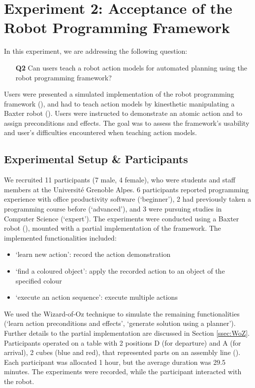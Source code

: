 \section{Experiment 2: Acceptance of the Robot Programming Framework}
\label{sec:Exp2}

In this experiment, we are addressing the following question:

\begin{enumerate}
  \item[\textbf{Q2}] Can users teach a robot action models for automated planning using the robot programming framework?
\end{enumerate}

Users were presented a simulated implementation of the robot programming framework (), and had to teach action models by kinesthetic manipulating a Baxter robot (). 
Users were instructed to demonstrate an atomic action and to assign preconditions and effects.
The goal was to assess the framework's usability and user's difficulties encountered when teaching action models.

\subsection{Experimental Setup \& Participants}
We recruited 11 participants (7 male, 4 female), who were students and staff members at the Universit\'{e} Grenoble Alpes. 
6 participants reported programming experience with office productivity software (`beginner'), 2 had previously taken a programming course before (`advanced'), and 3 were pursuing studies in Computer Science (`expert').
The experiments were conducted using a Baxter robot (), mounted with a partial implementation of the framework.
The implemented functionalities included:
\begin{itemize}
	\item `learn new action': record the action demonstration
	\item `find a coloured object': apply the recorded action to an object of the specified colour
	\item `execute an action sequence': execute multiple actions
\end{itemize}

We used the Wizard-of-Oz technique to simulate the remaining functionalities (\eg `learn action preconditions and effects', `generate solution using a planner').
Further details to the partial implementation are discussed in Section \ref{ssec:WoZ}.
Participants operated on a table with 2 positions D (for departure) and A (for arrival), 2 cubes (blue and red), that represented parts on an assembly line (). 
Each participant was allocated 1 hour, but the average duration was 29.5 minutes. 
The experiments were recorded, while the participant interacted with the robot. 


